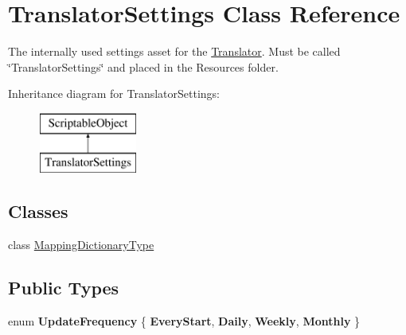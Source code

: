 \hypertarget{class_translator_settings}{}\section{Translator\+Settings Class Reference}
\label{class_translator_settings}


The internally used settings asset for the \hyperlink{class_translator}{Translator}. Must be called \char`\"{}\+Translator\+Settings\char`\"{} and placed in the Resources folder.  


Inheritance diagram for Translator\+Settings\+:\begin{figure}[H]
\begin{center}
\leavevmode
\includegraphics[height=2.000000cm]{class_translator_settings}
\end{center}
\end{figure}
\subsection*{Classes}
\begin{DoxyCompactItemize}
\item 
class \hyperlink{class_translator_settings_1_1_mapping_dictionary_type}{Mapping\+Dictionary\+Type}
\end{DoxyCompactItemize}
\subsection*{Public Types}
\begin{DoxyCompactItemize}
\item 
enum {\bfseries Update\+Frequency} \{ {\bfseries Every\+Start}, 
{\bfseries Daily}, 
{\bfseries Weekly}, 
{\bfseries Monthly}
 \}\hypertarget{class_translator_settings_a684c49f572533e0a92bbfaac667c769d}{}\label{class_translator_settings_a684c49f572533e0a92bbfaac667c769d}

\end{DoxyCompactItemize}
